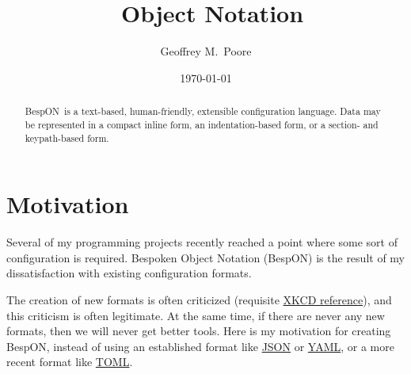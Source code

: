 \documentclass[11pt]{article}
\title{\textbf{\bespon} \\ \bespoken\ Object Notation}
\author{Geoffrey M.\ Poore}
\date{\today}
\newcommand{\bespon}{BespON}
\begin{document}
\maketitle


\begin{abstract}
\bespon\ is a text-based, human-friendly, extensible configuration language.  Data may be represented in a compact inline form, an indentation-based form, or a section- and keypath-based form.
\end{abstract}


\pagebreak
\tableofcontents
\pagebreak


\section{Motivation}

Several of my programming projects recently reached a point where some sort of configuration is required.  Bespoken Object Notation (\bespon) is the result of my dissatisfaction with existing configuration formats.

The creation of new formats is often criticized (requisite \href{https://xkcd.com/927/}{XKCD reference}), and this criticism is often legitimate.  At the same time, if there are never any new formats, then we will never get better tools.  Here is my motivation for creating \bespon, instead of using an established format like \href{http://www.json.org/}{JSON} or \href{http://yaml.org/}{YAML}, or a more recent format like \href{https://github.com/toml-lang/toml}{TOML}.
\end{document}
